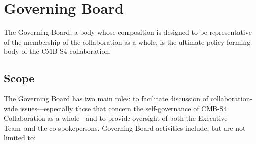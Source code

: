 \documentclass[12pt]{article}
\newcommand{\exec}{{Executive Team}}
\begin{document}
\section{Governing Board}

The Governing Board, a body whose composition is designed to be representative of the membership of the collaboration as a whole, is the ultimate policy forming body of the CMB-S4 collaboration. 

\subsection{Scope}
The Governing Board has two main roles: to facilitate discussion of collaboration-wide issues---especially those that concern the self-governance of CMB-S4 Collaboration as a whole---and to provide oversight of both the \exec \ and the co-spokepersons.
Governing Board activities include, but are not limited to: 
\end{document}
